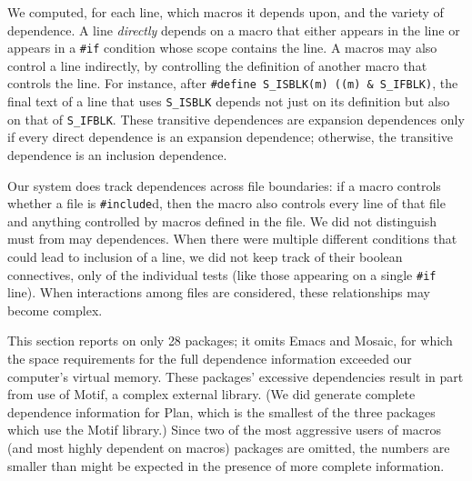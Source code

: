 \documentclass[10pt]{article}
\def\numpackageslesstwo{28}
\begin{document}

We computed, for each line, which macros it depends upon, and the variety
of dependence.  A line \emph{directly} depends on a macro that either
appears in the line or appears in a {\tt \#if} condition whose scope
contains the line.  A macros may also control a line indirectly, by
controlling the definition of another macro that controls the line.  For
instance, after {\tt \#define \verb|S_ISBLK|(m) ((m) \& \verb|S_IFBLK|)},
the final text of a line that uses \verb|S_ISBLK| depends not just on its
definition but also on that of \verb|S_IFBLK|.  These transitive
dependences are expansion dependences only if every direct dependence is an
expansion dependence; otherwise, the transitive dependence is an inclusion
dependence.

Our system does track dependences across file boundaries: if a macro
controls whether a file is {\tt \#include}d, then the macro also controls
every line of that file and anything controlled by macros defined in the
file.  We did not distinguish must from may dependences.  When there were
multiple different conditions that could lead to inclusion of a line, we
did not keep track of their boolean connectives, only of the individual
tests (like those appearing on a single {\tt \#if} line).  When
interactions among files are considered, these relationships may become
complex.



This section reports on only {\numpackageslesstwo} packages; it omits
Emacs and Mosaic, for which the space requirements for the full
dependence information exceeded our computer's virtual memory.  These
packages' excessive dependencies result in part from use of Motif, a
complex external library.  (We did generate complete dependence
information for Plan, which is the smallest of the three packages which
use the Motif library.)  Since two of the most aggressive users of
macros (and most highly dependent on macros) packages are omitted, the
numbers are smaller than might be expected in the presence of more
complete information.
\end{document}
